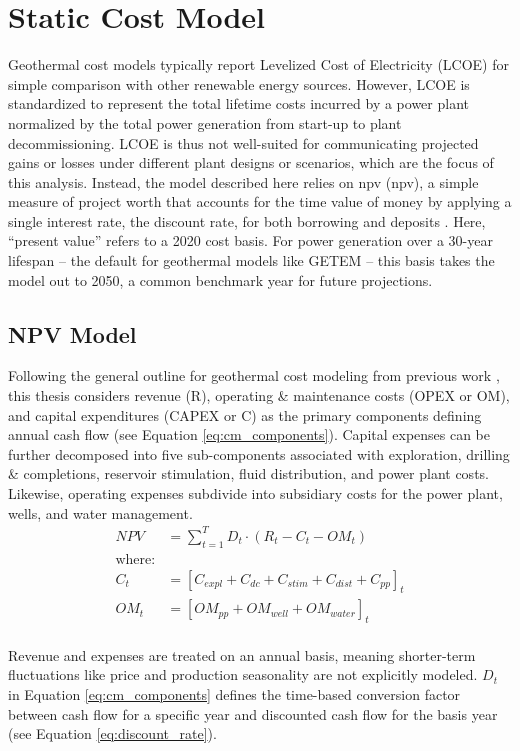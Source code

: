 \section{Static Cost Model}\label{ch4:cm_structure}
Geothermal cost models typically report Levelized Cost of Electricity (LCOE) for simple comparison with other renewable energy sources. However, LCOE is standardized to represent the total lifetime costs incurred by a power plant normalized by the total power generation from start-up to plant decommissioning. LCOE is thus not well-suited for communicating projected gains or losses under different plant designs or scenarios, which are the focus of this analysis. Instead, the model described here relies on \acrlong{npv} (\acrshort{npv}), a simple measure of project worth that accounts for the time value of money by applying a single interest rate, the discount rate, for both borrowing and deposits \citep[p.\ 195-215]{de_neufville_flexibility_2011}. Here, ``present value'' refers to a 2020 cost basis. For power generation over a 30-year lifespan -- the default for geothermal models like GETEM \citep{entingh_volume_2006} -- this basis takes the model out to 2050, a common benchmark year for future projections. 

\subsection{NPV Model}\label{ch4:cm_npv}
Following the general outline for geothermal cost modeling from previous work \citep[e.g.,][]{augustine_hydrothermal_2009, beckers_introducing_2013,tester_future_2006}, this thesis considers revenue (R), operating \& maintenance costs (OPEX or OM), and capital expenditures (CAPEX or C) as the primary components defining annual cash flow (see Equation \ref{eq:cm_components}). Capital expenses can be further decomposed into five  sub-components associated with exploration, drilling \& completions, reservoir stimulation, fluid distribution, and power plant costs. Likewise, operating expenses subdivide into subsidiary costs for the power plant, wells, and water management.
\begin{equation}
    \label{eq:cm_components}
    \begin{aligned}
    NPV &= \sum_{t=1}^{T}D_t \cdot \left( R_t - C_t - OM_t \right)\\
    \text{where:}\\
    C_t &= \left[C_{expl} + C_{dc} + C_{stim} + C_{dist} + C_{pp}\right]_t\\
    OM_t &= \left[OM_{pp} + OM_{well} + OM_{water}\right]_t
    \end{aligned}
\end{equation}
\\
Revenue and expenses are treated on an annual basis, meaning shorter-term fluctuations like price and production seasonality are not explicitly modeled. $D_t$ in Equation \ref{eq:cm_components} defines the time-based conversion factor between cash flow for a specific year and discounted cash flow for the basis year (see Equation \ref{eq:discount_rate}).

